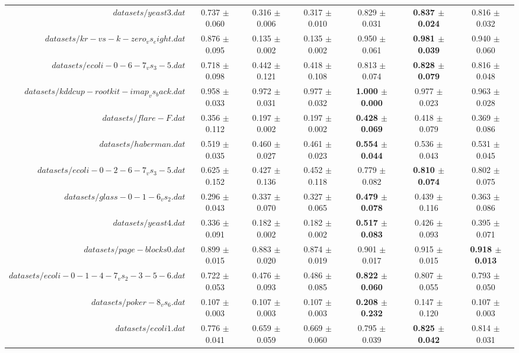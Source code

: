 \begin{table}[!ht]
{\begin{tabular}{r c c c c c c}
$datasets/yeast3.dat$ & 0.737 $\pm$ 0.060 & 0.316 $\pm$ 0.006 & 0.317 $\pm$ 0.010 & 0.829 $\pm$ 0.031 & \textbf{0.837 $\pm$ 0.024} & 0.816 $\pm$ 0.032 \\
$datasets/kr-vs-k-zero_vs_eight.dat$ & 0.876 $\pm$ 0.095 & 0.135 $\pm$ 0.002 & 0.135 $\pm$ 0.002 & 0.950 $\pm$ 0.061 & \textbf{0.981 $\pm$ 0.039} & 0.940 $\pm$ 0.060 \\
$datasets/ecoli-0-6-7_vs_3-5.dat$ & 0.718 $\pm$ 0.098 & 0.442 $\pm$ 0.121 & 0.418 $\pm$ 0.108 & 0.813 $\pm$ 0.074 & \textbf{0.828 $\pm$ 0.079} & 0.816 $\pm$ 0.048 \\
$datasets/kddcup-rootkit-imap_vs_back.dat$ & 0.958 $\pm$ 0.033 & 0.972 $\pm$ 0.031 & 0.977 $\pm$ 0.032 & \textbf{1.000 $\pm$ 0.000} & 0.977 $\pm$ 0.023 & 0.963 $\pm$ 0.028 \\
$datasets/flare-F.dat$ & 0.356 $\pm$ 0.112 & 0.197 $\pm$ 0.002 & 0.197 $\pm$ 0.002 & \textbf{0.428 $\pm$ 0.069} & 0.418 $\pm$ 0.079 & 0.369 $\pm$ 0.086 \\
$datasets/haberman.dat$ & 0.519 $\pm$ 0.035 & 0.460 $\pm$ 0.027 & 0.461 $\pm$ 0.023 & \textbf{0.554 $\pm$ 0.044} & 0.536 $\pm$ 0.043 & 0.531 $\pm$ 0.045 \\
$datasets/ecoli-0-2-6-7_vs_3-5.dat$ & 0.625 $\pm$ 0.152 & 0.427 $\pm$ 0.136 & 0.452 $\pm$ 0.118 & 0.779 $\pm$ 0.082 & \textbf{0.810 $\pm$ 0.074} & 0.802 $\pm$ 0.075 \\
$datasets/glass-0-1-6_vs_2.dat$ & 0.296 $\pm$ 0.043 & 0.337 $\pm$ 0.070 & 0.327 $\pm$ 0.065 & \textbf{0.479 $\pm$ 0.078} & 0.439 $\pm$ 0.116 & 0.363 $\pm$ 0.086 \\
$datasets/yeast4.dat$ & 0.336 $\pm$ 0.091 & 0.182 $\pm$ 0.002 & 0.182 $\pm$ 0.002 & \textbf{0.517 $\pm$ 0.083} & 0.426 $\pm$ 0.093 & 0.395 $\pm$ 0.071 \\
$datasets/page-blocks0.dat$ & 0.899 $\pm$ 0.015 & 0.883 $\pm$ 0.020 & 0.874 $\pm$ 0.019 & 0.901 $\pm$ 0.017 & 0.915 $\pm$ 0.015 & \textbf{0.918 $\pm$ 0.013} \\
$datasets/ecoli-0-1-4-7_vs_2-3-5-6.dat$ & 0.722 $\pm$ 0.053 & 0.476 $\pm$ 0.093 & 0.486 $\pm$ 0.085 & \textbf{0.822 $\pm$ 0.060} & 0.807 $\pm$ 0.055 & 0.793 $\pm$ 0.050 \\
$datasets/poker-8_vs_6.dat$ & 0.107 $\pm$ 0.003 & 0.107 $\pm$ 0.003 & 0.107 $\pm$ 0.003 & \textbf{0.208 $\pm$ 0.232} & 0.147 $\pm$ 0.120 & 0.107 $\pm$ 0.003 \\
$datasets/ecoli1.dat$ & 0.776 $\pm$ 0.041 & 0.659 $\pm$ 0.059 & 0.669 $\pm$ 0.060 & 0.795 $\pm$ 0.039 & \textbf{0.825 $\pm$ 0.042} & 0.814 $\pm$ 0.031 \\

\end{tabular}}
\end{table}
